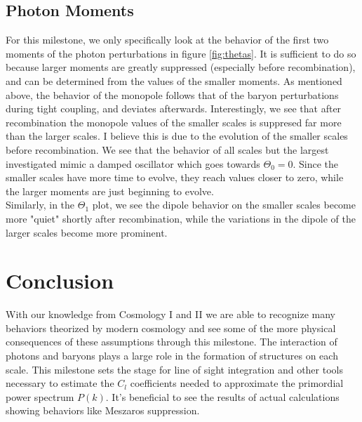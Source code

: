 \documentclass[a4paper]{article}
\begin{document}
\subsection{Photon Moments}

For this milestone, we only specifically look at the behavior of the first two moments of the photon perturbations in figure \ref{fig:thetas}. It is sufficient to do so because larger moments are greatly suppressed (especially before recombination), and can be determined from the values of the smaller moments. As mentioned above, the behavior of the monopole follows that of the baryon perturbations during tight coupling, and deviates afterwards. Interestingly, we see that after recombination the monopole values of the smaller scales is suppresed far more than the larger scales. I believe this is due to the evolution of the smaller scales before recombination. We see that the behavior of all scales but the largest investigated mimic a damped oscillator which goes towards $\Theta_0 = 0$. Since the smaller scales have more time to evolve, they reach values closer to zero, while the larger moments are just beginning to evolve.\\

Similarly, in the $\Theta_1$ plot, we see the dipole behavior on the smaller scales become more "quiet" shortly after recombination, while the variations in the dipole of the larger scales become more prominent.

\section{Conclusion}\label{sec:conc}

With our knowledge from Cosmology I and II we are able to recognize many behaviors theorized by modern cosmology and see some of the more physical consequences of these assumptions through this milestone. The interaction of photons and baryons plays a large role in the formation of structures on each scale. This milestone sets the stage for line of sight integration and other tools necessary to estimate the $C_l$ coefficients needed to approximate the primordial power spectrum $P(k)$. It's beneficial to see the results of actual calculations showing behaviors like Meszaros suppression.
\end{document}
